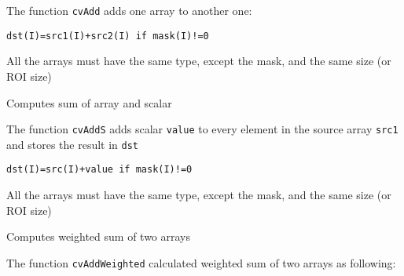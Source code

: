 The function \texttt{cvAdd} adds one array to another one:

\begin{lstlisting}
dst(I)=src1(I)+src2(I) if mask(I)!=0
\end{lstlisting}

All the arrays must have the same type, except the mask, and the same size (or ROI size)



Computes sum of array and scalar


\begin{description}
\end{description}


The function \texttt{cvAddS} adds scalar \texttt{value} to every element in the source array \texttt{src1} and stores the result in \texttt{dst}

\begin{lstlisting}
dst(I)=src(I)+value if mask(I)!=0
\end{lstlisting}

All the arrays must have the same type, except the mask, and the same size (or ROI size)



Computes weighted sum of two arrays


\begin{description}
\end{description}

The function \texttt{cvAddWeighted} calculated weighted sum of two arrays as following:


